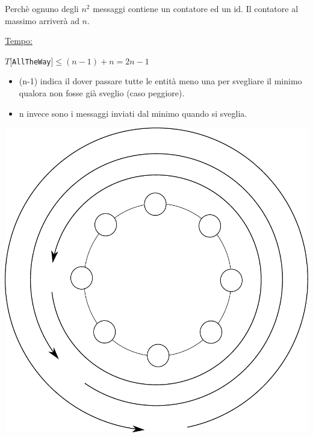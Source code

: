 Perchè ognuno degli $n^2$ messaggi contiene un contatore ed un id. Il contatore al massimo arriverà ad $n$.


\underline{Tempo:}
\begin{center}
  $T[$\texttt{AllTheWay}$] \leq (n - 1) + n   = 2n - 1$
\end{center}
\begin{itemize}
    \item (n-1) indica il dover passare tutte le entità meno una per svegliare il minimo qualora non fosse già sveglio (caso peggiore).
    \item n invece sono i messaggi inviati dal minimo quando si sveglia.
\end{itemize}



\begin{center}
  \includegraphics[scale=0.5]{images/n_44}
\end{center}

